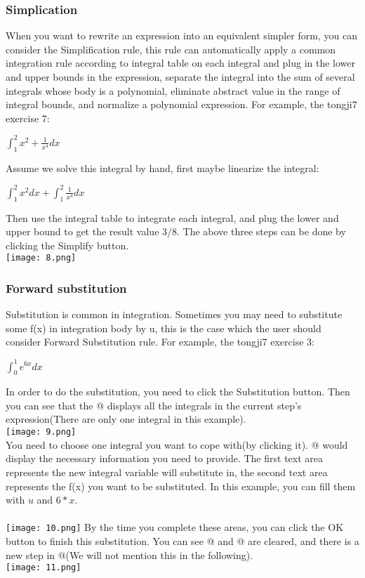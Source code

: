 \documentclass[titlepage]{article}
\makeatletter
\newcommand*{\rom}[1]{\expandafter\@slowromancap\romannumeral #1@}
\makeatother
\begin{document}
\subsubsection{Simplication}
When you want to rewrite an expression into an equivalent simpler form, you can consider the Simplification rule, this rule can automatically apply a common integration rule according to integral table on each integral and plug in the lower and upper bounds in the expression, separate the integral into the sum of several integrals whose body is a polynomial, eliminate abstract value in the range of integral bounds, and normalize a polynomial expression. For example, the tongji7 exercise 7:
\begin{center}
$\int_{1}^{2} x^2 + \frac{1}{x^4} dx$
\end{center}
Assume we solve this integral by hand, first maybe linearize the integral:
\begin{center}
$\int_{1}^{2} x^2 dx + \int_{1}^{2} \frac{1}{x^4} dx$
\end{center}
Then use the integral table to integrate each integral, and plug the lower and upper bound to get the result value 3/8. The above three steps can be done by clicking the \colorbox{mygray}{Simplify} button.\\
\texttt{[image: 8.png]}
\subsubsection{Forward substitution}
Substitution is common in integration. Sometimes you may need to substitute some f(x) in integration body by u, this is the case which the user should consider Forward Substitution rule. For example, the tongji7 exercise 3:
\begin{center}
$\int_{0}^{1} e^{6x} dx$
\end{center}
In order to do the substitution, you need to click the \colorbox{mygray}{Substitution} button. Then you can see that the \rom{4} displays all the integrals in the current step's expression(There are only one integral in this example). \\
\texttt{[image: 9.png]}\\
You need to choose one integral you want to cope with(by clicking it). \rom{5} would display the necessary information you need to provide. The first text area represents the new integral variable will substitute in, the second text area represents the f(x) you want to be substituted. In this example, you can fill them with $u$ and $6*x$.\\\\
\texttt{[image: 10.png]}
By the time you complete these areas, you can click the \colorbox{mygray}{OK} button to finish this substitution. You can see \rom{4} and \rom{5} are cleared, and there is a new step in \rom{3}(We will not mention this in the following).\\
\texttt{[image: 11.png]}
\end{document}
